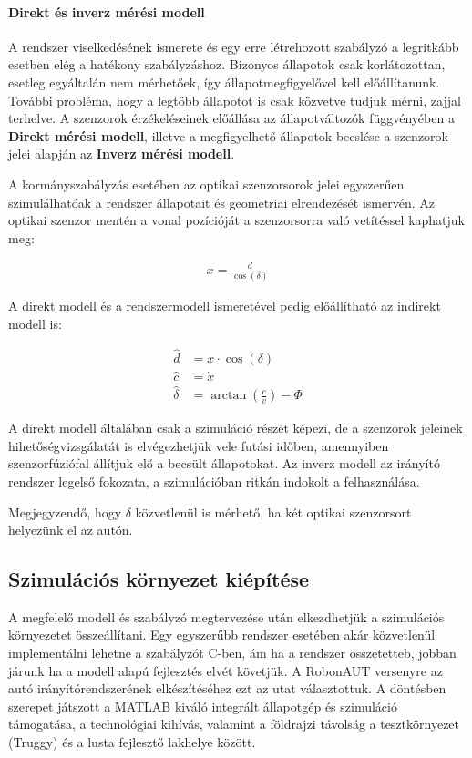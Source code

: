 \paragraph{Direkt és inverz mérési modell}

A rendszer viselkedésének ismerete és egy erre létrehozott szabályzó a legritkább esetben elég a hatékony szabályzáshoz. Bizonyos állapotok csak korlátozottan, esetleg egyáltalán nem mérhetőek, így állapotmegfigyelővel kell előállítanunk. További probléma, hogy a legtöbb állapotot is csak közvetve tudjuk mérni, zajjal terhelve.
A szenzorok érzékeléseinek előállása az állapotváltozók függvényében a \textbf{Direkt mérési modell}, illetve a megfigyelhető állapotok becslése a szenzorok jelei alapján az \textbf{Inverz mérési modell}.

A kormányszabályzás esetében az optikai szenzorsorok jelei egyszerűen szimulálhatóak a rendszer állapotait és geometriai elrendezését ismervén. Az optikai szenzor mentén a vonal pozícióját a szenzorsorra való vetítéssel kaphatjuk meg:

\begin{align}
    x = \frac{d}{\cos(\delta)}
\end{align}

A direkt modell és a rendszermodell ismeretével pedig előállítható az indirekt modell is:

\begin{align}
    \hat{d} &= x \cdot \cos(\delta) \\
    \hat{c} &=\dot{x} \\
    \hat{\delta} &= \arctan \left(\frac{c}{v}\right) - \Phi
\end{align}

A direkt modell általában csak a szimuláció részét képezi, de a szenzorok jeleinek hihetőségvizsgálatát is elvégezhetjük vele futási időben, amennyiben szenzorfúziófal állítjuk elő a becsült állapotokat.
Az inverz modell az irányító rendszer legelső fokozata, a szimulációban ritkán indokolt a felhasználása.

Megjegyzendő, hogy $\delta$ közvetlenül is mérhető, ha két optikai szenzorsort helyezünk el az autón.

\subsection{Szimulációs környezet kiépítése}

A megfelelő modell és szabályzó megtervezése után elkezdhetjük a szimulációs környezetet összeállítani. Egy egyszerűbb rendszer esetében akár közvetlenül implementálni lehetne a szabályzót C-ben, ám ha a rendszer összetetteb, jobban járunk ha a modell alapú fejlesztés elvét követjük. A RobonAUT versenyre az autó irányítórendszerének elkészítéséhez ezt az utat választottuk. A döntésben szerepet játszott a MATLAB kiváló integrált állapotgép és szimuláció támogatása, a technológiai kihívás, valamint a földrajzi távolság a tesztkörnyezet (Truggy) és a lusta fejlesztő lakhelye között.

